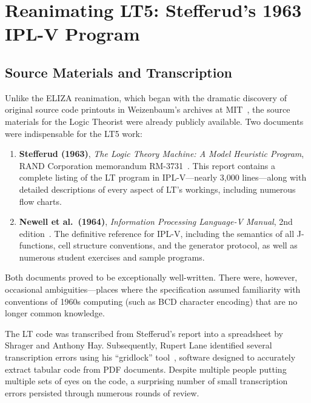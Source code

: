 \documentclass[journal]{IEEEtran}
\begin{document}
\section{Reanimating LT5: Stefferud's 1963 IPL-V Program}
\label{sec:lt5}

\subsection{Source Materials and Transcription}
\label{sec:sources}

Unlike the ELIZA reanimation, which began with the dramatic discovery
of original source code printouts in Weizenbaum's archives at
MIT~\cite{lane2025eliza}, the source materials for the Logic Theorist
were already publicly available. Two documents were indispensable for
the LT5 work:

\begin{enumerate}
\item \textbf{Stefferud (1963)}, \textit{The Logic Theory Machine: A
  Model Heuristic Program}, RAND Corporation memorandum
  RM-3731~\cite{stefferud1963lt}. This report contains a complete
  listing of the LT program in IPL-V---nearly 3,000 lines---along with
  detailed descriptions of every aspect of LT's workings, including
  numerous flow charts.

\item \textbf{Newell et al.\ (1964)}, \textit{Information Processing
  Language-V Manual}, 2nd edition~\cite{newell1964ipl}. The definitive
  reference for IPL-V, including the semantics of all J-functions,
  cell structure conventions, and the generator protocol, as well as
  numerous student exercises and sample programs.
\end{enumerate}

Both documents proved to be exceptionally well-written. There were,
however, occasional ambiguities---places where the specification
assumed familiarity with conventions of 1960s computing (such as BCD
character encoding) that are no longer common knowledge.

The LT code was transcribed from Stefferud's report into a spreadsheet
by Shrager and Anthony Hay. Subsequently, Rupert Lane identified
several transcription errors using his ``gridlock''
tool~\cite{lane2024gridlock}, software designed to accurately extract
tabular code from PDF documents. Despite multiple people putting
multiple sets of eyes on the code, a surprising number of small
transcription errors persisted through numerous rounds of review.
\end{document}
